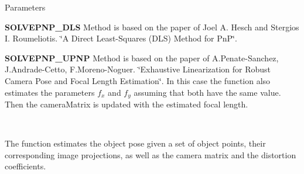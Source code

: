 \begin{DoxyParams}{Parameters}
\begin{DoxyItemize}
\item {\bfseries S\+O\+L\+V\+E\+P\+N\+P\+\_\+\+D\+LS} Method is based on the paper of Joel A. Hesch and Stergios I. Roumeliotis. \char`\"{}\+A Direct Least-\/\+Squares (\+D\+L\+S) Method for Pn\+P\char`\"{}.
\item {\bfseries S\+O\+L\+V\+E\+P\+N\+P\+\_\+\+U\+P\+NP} Method is based on the paper of A.\+Penate-\/\+Sanchez, J.\+Andrade-\/\+Cetto, F.\+Moreno-\/\+Noguer. \char`\"{}\+Exhaustive Linearization for Robust Camera Pose and Focal Length
\+Estimation\char`\"{}. In this case the function also estimates the parameters $f_x$ and $f_y$ assuming that both have the same value. Then the camera\+Matrix is updated with the estimated focal length. 
\end{DoxyItemize}\\
\hline
\end{DoxyParams}
The function estimates the object pose given a set of object points, their corresponding image projections, as well as the camera matrix and the distortion coefficients. 

